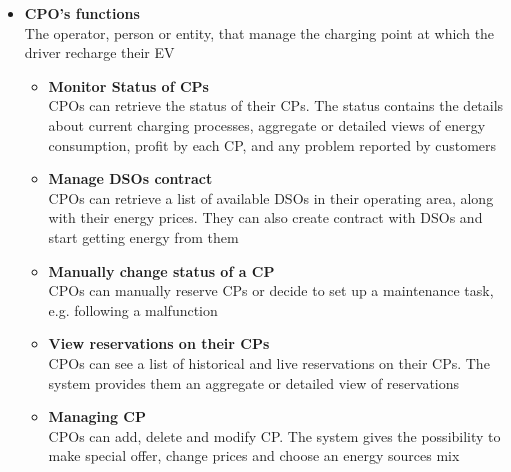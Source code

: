 \begin{itemize}
      \item \textbf{CPO's functions}\\
            The operator, person or entity, that manage the charging point at which the driver recharge their EV
            \begin{itemize}
                  \item \textbf{Monitor Status of CPs}\\
                        CPOs can retrieve the status of their CPs. The status contains the details about current charging processes, aggregate or detailed views of energy consumption, profit by each CP, and any problem reported by customers
                  \item \textbf{Manage DSOs contract}\\
                        CPOs can retrieve a list of available DSOs in their operating area, along with their energy prices. They can also create contract with DSOs and start getting energy from them
                  \item \textbf{Manually change status of a CP}\\
                        CPOs can manually reserve CPs or decide to set up a maintenance task, e.g. following a malfunction
                  \item \textbf{View reservations on their CPs}\\
                        CPOs can see a list of historical and live reservations on their CPs. The system provides them an aggregate or detailed view of reservations
                  \item \textbf{Managing CP}\\
                        CPOs can add, delete and modify CP. The system gives the possibility to make special offer, change prices and choose an energy sources mix
            \end{itemize}
\end{itemize}


